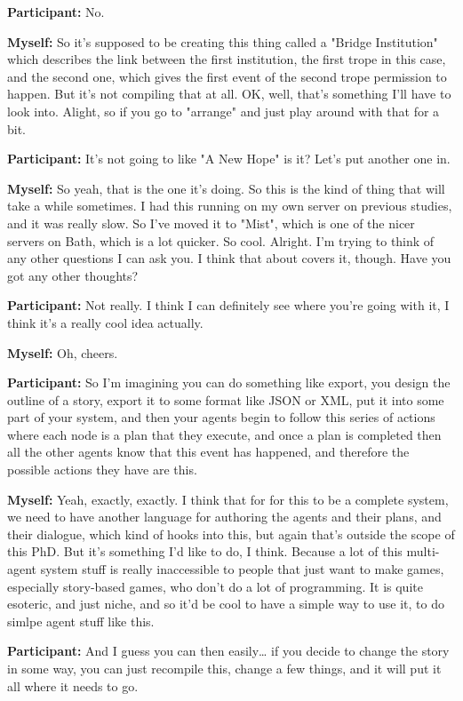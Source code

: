 \documentclass[11pt]{report}
\begin{document}
\begin{linenumbers}
\textbf{Participant:} No.

\textbf{Myself:} So it's supposed to be creating this thing called a "Bridge Institution" which describes the link between the first institution, the first trope in this case, and the second one, which gives the first event of the second trope permission to happen. But it's not compiling that at all. OK, well, that's something I'll have to look into. Alight, so if you go to "arrange" and just play around with that for a bit.

\textbf{Participant:} It's not going to like "A New Hope" is it? Let's put another one in.

\textbf{Myself:} So yeah, that is the one it's doing. So this is the kind of thing that will take a while sometimes. I had this running on my own server on previous studies, and it was really slow. So I've moved it to "Mist", which is one of the nicer servers on Bath, which is a lot quicker. So cool. Alright. I'm trying to think of any other questions I can ask you. I think that about covers it, though. Have you got any other thoughts?

\textbf{Participant:} Not really. I think I can definitely see where you're going with it, I think it's a really cool idea actually.

\textbf{Myself:} Oh, cheers.

\textbf{Participant:} So I'm imagining you can do something like export, you design the outline of a story, export it to some format like JSON or XML, put it into some part of your system, and then your agents begin to follow this series of actions where each node is a plan that they execute, and once a plan is completed then all the other agents know that this event has happened, and therefore the possible actions they have are this.

\textbf{Myself:} Yeah, exactly, exactly. I think that for for this to be a complete system, we need to have another language for authoring the agents and their plans, and their dialogue, which kind of hooks into this, but again that's outside the scope of this PhD. But it's something I'd like to do, I think. Because a lot of this multi-agent system stuff is really inaccessible to people that just want to make games, especially story-based games, who don't do a lot of programming. It is quite esoteric, and just niche, and so it'd be cool to have a simple way to use it, to do simlpe agent stuff like this.

\textbf{Participant:} And I guess you can then easily\ldots{} if you decide to change the story in some way, you can just recompile this, change a few things, and it will put it all where it needs to go.


\end{linenumbers}
\end{document}

